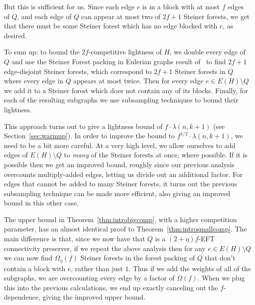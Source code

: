 \documentclass{article}
\theoremstyle{plain}
\theoremstyle{definition}
\begin{document}
But this is sufficient for us.  Since each edge $e$ is in a block with at most $f$ edges of $Q$, and each edge of $Q$ can appear at most two of $2f+1$ Steiner forests, we get that there must be some Steiner forest which has no edge blocked with $e$, as desired.

To sum up: to bound the $2f$-competitive lightness of $H$, we double every edge of $Q$ and use the Steiner Forest packing in Eulerian graphs result of~\cite{chekuri2009approximate} to find $2f+1$ edge-disjoint Steiner forests, which correspond to $2f+1$ Steiner forests in $Q$ where every edge in $Q$ appears at most twice.  Then for every edge $e \in E(H) \setminus Q$ we add it to a Steiner forest which does not contain any of its blocks.  Finally, for each of the resulting subgraphs we use subsampling techniques to bound their lightness.  

This approach turns out to give a lightness bound of $f \cdot \lambda(n, k+1)$ (see Section~\ref{sec:warmup}).
In order to improve the bound to $f^{1/2} \cdot \lambda(n, k+1)$, we need to be a bit more careful.  At a very high level, we allow ourselves to add edges of $E(H) \setminus Q$ to \emph{many} of the Steiner forests at once, where possible.
If it is possible then we get an improved bound, roughly since our previous analysis overcounts multiply-added edges, letting us divide out an additional factor.
For edges that cannot be added to many Steiner forests, it turns out the previous subsampling technique can be made more efficient, also giving an improved bound in this other case.

The upper bound in Theorem~\ref{thm:introbigcomp}, with a higher competition parameter, has an almost identical proof to Theorem~\ref{thm:introsmallcomp}.  The main difference is that, since we now have that $Q$ is a $(2+\eta)f$-EFT connectivity preserver, if we repeat the above analysis then for any $e \in E(H) \setminus Q$ we can now find $\Omega_{\eta}(f)$ Steiner forests in the forest packing of $Q$ that don't contain a block with $e$, rather than just $1$.  Thus if we add the weights of all of the subgraphs, we are overcounting every edge by a factor of $\Omega(f)$.  When we plug this into the previous calculations, we end up exactly canceling out the $f$-dependence, giving the improved upper bound.
\end{document}

